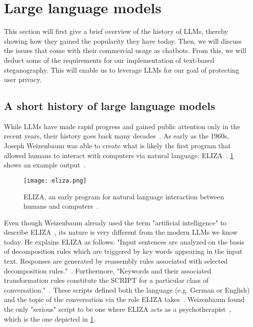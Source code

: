 \section{Large language models}
\label{sec:LLMs}
This section will first give a brief overview of the history of \glspl{LLM}, thereby showing how they gained the popularity they have today. Then, we will discuss the issues that come with their commercial usage as chatbots. From this, we will deduct some of the requirements for our implementation of text-based steganography. This will enable us to leverage \glspl{LLM} for our goal of protecting user privacy.

\subsection{A short history of large language models}
\label{sec:aShortHistoryOfLLMs}
While \glspl{LLM} have made rapid progress and gained public attention only in the recent years, their history goes back many decades~\cite{berryLimitsComputationJoseph2023}. As early as the 1960s, Joseph Weizenbaum was able to create what is likely the first program that allowed humans to interact with computers via natural language: ELIZA~\cite{weizenbaumELIZAComputerProgram1966}. \cref{fig:eliza} shows an example output~\cite{wangELIZAChatGPTBrief2024}.

\begin{figure}
    \begin{wide}
        \centering
        \captionsetup{width=\linewidth}
        \texttt{[image: eliza.png]}
        \caption[ELIZA]{ELIZA, an early program for natural language interaction between humans and computers~\cite{wangELIZAChatGPTBrief2024}.}
        \label{fig:eliza}
    \end{wide}
\end{figure}

Even though Weizenbaum already used the term "artificial intelligence" to describe ELIZA~\cite{weizenbaumELIZAComputerProgram1966}, its nature is very different from the modern \glspl{LLM} we know today. He explains ELIZA as follows: "Input sentences are analyzed on the basis of decomposition rules which are triggered by key words appearing in the input text. Responses are generated by reassembly rules associated with selected decomposition rules."~\cite{weizenbaumELIZAComputerProgram1966}. Furthermore, "Keywords and their associated transformation rules constitute the SCRIPT for a particular class of conversation."~\cite{weizenbaumELIZAComputerProgram1966}. These scripts defined both the language (e.g. German or English) and the topic of the conversation via the role ELIZA takes~\cite{weizenbaumELIZAComputerProgram1966}. Weizenbaum found the only "serious" script to be one where ELIZA acts as a psychotherapist~\cite{weizenbaumELIZAComputerProgram1966}, which is the one depicted in \cref{fig:eliza}.

